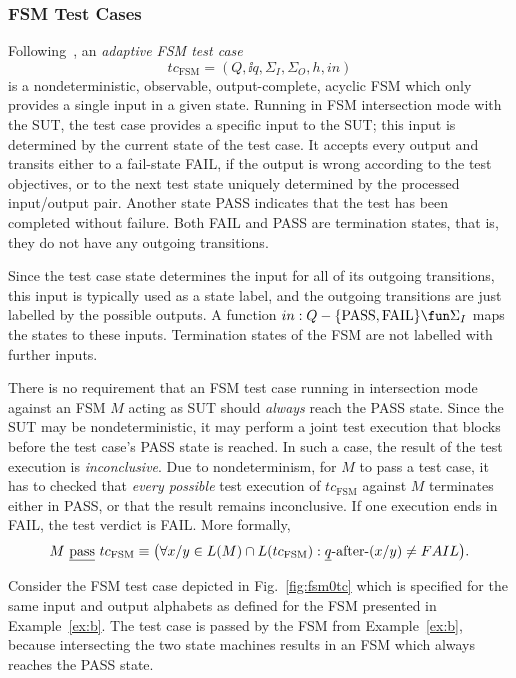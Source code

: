 \subsubsection*{FSM Test Cases}

Following~\cite{DBLP:conf/hase/PetrenkoY14}, 
an \emph{adaptive FSM test case} 
$$
tc_\text{FSM}=(Q,\ii q,\Sigma_I,\Sigma_O,h,in)
$$ 
is a nondeterministic, observable, output-complete, acyclic FSM which only provides a single input in a given state. Running in FSM intersection mode with the SUT, the test case provides a specific input to the SUT; this input is determined by the current state of the test case. It accepts every output and transits either to a fail-state FAIL, if the output is wrong according to the test objectives, or to the next test state uniquely determined  by the processed input/output pair. Another state PASS indicates that
the test has been completed without failure. Both FAIL and PASS are termination states, that is, they do not have any outgoing transitions.

Since the test case state determines the input for all of its outgoing transitions, this input is typically used as a state label, and the outgoing transitions are just labelled by the possible outputs. A function $in : Q -\{  \text{PASS}, \text{FAIL} \} 
\fun\Sigma_I$ maps the states to these inputs. Termination states
of the FSM are not labelled with further inputs.

There is no requirement that an FSM test case running in intersection mode against
an FSM $M$ acting as SUT should {\it always} reach the PASS state. Since the SUT may be nondeterministic, it may perform a joint test execution that blocks before
the test case's PASS state is reached. In such a case, the result of the test execution is \emph{inconclusive}. Due to nondeterminism, for $M$ to pass a test case, it 
has to checked that {\it every possible} test execution of  $tc_\text{FSM}$ against $M$
terminates either in PASS, or that the result remains inconclusive. If one execution ends in FAIL, the test verdict is FAIL. More formally,
$$
M\ \underline{\text{pass}}\ tc_\text{FSM} \equiv 
\big(
\forall x/y \in L(M)\cap L(tc_\text{FSM}): \underline{q}\text{-after-}(x/y) \neq FAIL
\big).
$$

\begin{example}
Consider the FSM test case depicted in Fig.~\ref{fig:fsm0tc} which is specified
for the same input and output alphabets as defined for  the FSM presented in Example~\ref{ex:b}. The test case is passed by the FSM from Example~\ref{ex:b}, because 
intersecting the two state machines results in an FSM which always reaches the PASS state.
\xbox
\end{example}


